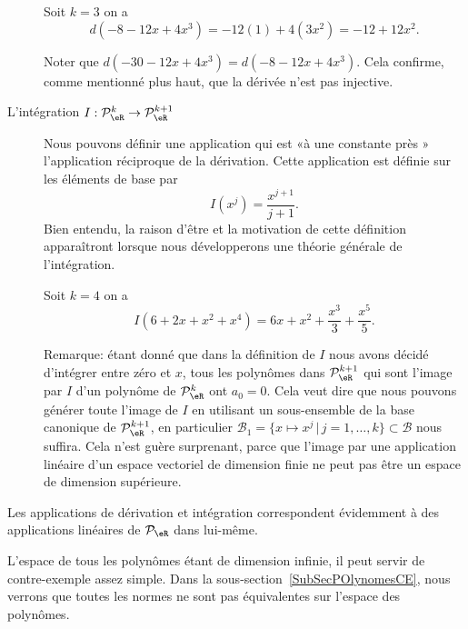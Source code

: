 \begin{description}
		\begin{example} Soit \( k=3\) on a
			\begin{equation}
				d(-8-12x+4x^3)= -12 (1) + 4 (3x^2) = -12+12 x^2.
			\end{equation}

			Noter que \( d(-30-12x+4x^3)=d(-8-12x+4x^3)\). Cela confirme, comme mentionné plus haut, que la dérivée n'est pas injective.
		\end{example}
	\item[L'intégration \( I: \mathcal{P}_\eR^k \to \mathcal{P}_\eR^{k+1}\)] Nous pouvons définir une application qui est «à une constante près » l'application réciproque de la dérivation. Cette application est définie sur les éléments de base par
		\begin{equation}
			I(x^j)= \frac{x^{j+1}}{j+1}.
		\end{equation}
		Bien entendu, la raison d'être et la motivation de cette définition apparaîtront lorsque nous développerons une théorie générale de l'intégration.

		\begin{example}
			Soit \( k=4\) on a
			\begin{equation}
				I(6+2x+x^2+x^4)= 6x+x^2+\frac{x^3}{3}+\frac{x^5}{5}.
			\end{equation}
		\end{example}

		Remarque: étant donné que dans la définition de \( I\) nous avons décidé d'intégrer entre zéro et \( x\), tous les polynômes dans \( \mathcal{P}_\eR^{k+1}\) qui sont l'image par \( I\) d'un polynôme de \( \mathcal{P}_\eR^{k}\) ont \( a_0=0\). Cela veut dire que nous pouvons générer toute l'image de \( I\) en utilisant un sous-ensemble de la base canonique de \( \mathcal{P}_\eR^{k+1}\), en particulier \( \mathcal{B}_1=\{x\mapsto x^j \,|\, j=1, \ldots, k\}\subset \mathcal{B}\) nous suffira. Cela n'est guère surprenant, parce que l'image par une application linéaire d'un espace vectoriel de dimension finie ne peut pas être un espace de dimension supérieure.
\end{description}

Les applications de dérivation et intégration correspondent évidemment à des applications linéaires de \( \mathcal{P}_\eR\) dans lui-même.

L'espace de tous les polynômes étant de dimension infinie, il peut servir de contre-exemple assez simple. Dans la sous-section~\ref{SubSecPOlynomesCE}, nous verrons que toutes les normes ne sont pas équivalentes sur l'espace des polynômes.

